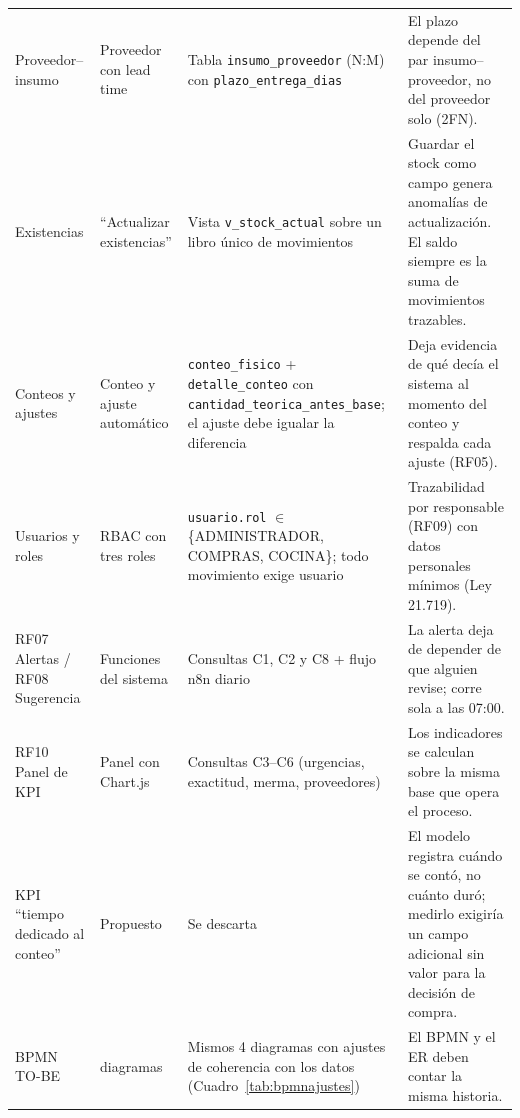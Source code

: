 \documentclass[11pt,letterpaper]{article}
\begin{document}
{\begin{longtable}{>{\raggedright\arraybackslash}p{2.6cm}>{\raggedright\arraybackslash}p{3.4cm}>{\raggedright\arraybackslash}p{3.6cm}>{\raggedright\arraybackslash}p{5.2cm}}
Proveedor--insumo & Proveedor con lead time & Tabla \texttt{insumo\_proveedor} (N:M) con \texttt{plazo\_entrega\_dias} & El plazo depende del par insumo--proveedor, no del proveedor solo (2FN). \\
Existencias & ``Actualizar existencias'' & Vista \texttt{v\_stock\_actual} sobre un libro único de movimientos & Guardar el stock como campo genera anomalías de actualización. El saldo siempre es la suma de movimientos trazables. \\
Conteos y ajustes & Conteo y ajuste automático & \texttt{conteo\_fisico} + \texttt{detalle\_conteo} con \texttt{cantidad\_teorica\_antes\_base}; el ajuste debe igualar la diferencia & Deja evidencia de qué decía el sistema al momento del conteo y respalda cada ajuste (RF05). \\
Usuarios y roles & RBAC con tres roles & \texttt{usuario.rol} $\in$ \{ADMINISTRADOR, COMPRAS, COCINA\}; todo movimiento exige usuario & Trazabilidad por responsable (RF09) con datos personales mínimos (Ley 21.719). \\
RF07 Alertas / RF08 Sugerencia & Funciones del sistema & Consultas C1, C2 y C8 + flujo n8n diario & La alerta deja de depender de que alguien revise; corre sola a las 07:00. \\
RF10 Panel de KPI & Panel con Chart.js & Consultas C3--C6 (urgencias, exactitud, merma, proveedores) & Los indicadores se calculan sobre la misma base que opera el proceso. \\
KPI ``tiempo dedicado al conteo'' & Propuesto & Se descarta & El modelo registra cuándo se contó, no cuánto duró; medirlo exigiría un campo adicional sin valor para la decisión de compra. \\
BPMN TO-BE & 4 diagramas & Mismos 4 diagramas con ajustes de coherencia con los datos (Cuadro~\ref{tab:bpmnajustes}) & El BPMN y el ER deben contar la misma historia. \\
\bottomrule
\end{longtable}
}
\end{document}

